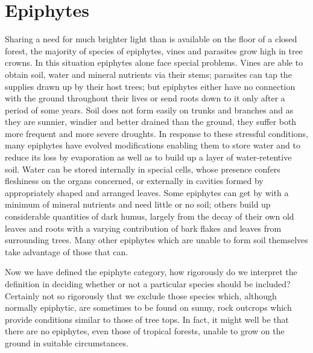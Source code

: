 \section{Epiphytes}

Sharing a need for much brighter light than is available on the floor of a closed forest, the majority of species of epiphytes, vines and parasites grow high in tree crowns.
In this situation epiphytes alone face special problems.
Vines are able to obtain soil, water and mineral nutrients via their stems; parasites can tap the supplies drawn up by their host trees; but epiphytes either have no connection with the ground throughout their lives or send roots down to it only after a period of some years.
Soil does not form easily on trunks and branches and as they are sunnier, windier and better drained than the ground, they suffer both more frequent and more severe droughts.
In response to these stressful conditions, many epiphytes have evolved modifications enabling them to store water and to reduce its loss by evaporation as well as to build up a layer of water-retentive soil.
Water can be stored internally in special cells, whose presence confers fleshiness on the organs concerned, or externally in cavities formed by appropriately shaped and arranged leaves.
Some epiphytes can get by with a minimum of mineral nutrients and need little or no soil; others build up considerable quantities of dark humus, largely from the decay of their own old leaves and roots with a varying contribution of bark flakes and leaves from surrounding trees.
Many other epiphytes which are unable to form soil themselves take advantage of those that can.

Now we have defined the epiphyte category, how rigorously do we interpret the definition in deciding whether or not a particular species should be included? Certainly not so rigorously that we exclude those species which, although normally epiphytic, are sometimes to be found on sunny, rock outcrops which provide conditions similar to those of tree tops.
In fact, it might well be that there are no epiphytes, even those of tropical forests, unable to grow on the ground in suitable circumstances.

